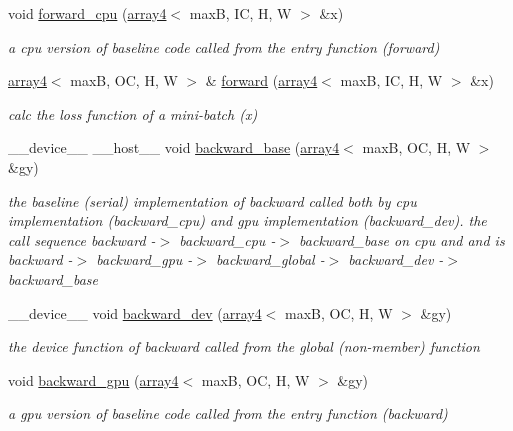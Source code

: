 \begin{DoxyCompactItemize}
void \hyperlink{structConvolution2D_ac1dcf1aebcf205c34bbf604d3b68562b}{forward\+\_\+cpu} (\hyperlink{structarray4}{array4}$<$ maxB, IC, H, W $>$ \&x)
\begin{DoxyCompactList}\small\item\em a cpu version of baseline code called from the entry function (forward) \end{DoxyCompactList}\item 
\hyperlink{structarray4}{array4}$<$ maxB, OC, H, W $>$ \& \hyperlink{structConvolution2D_ae6dcfaea38b779de24bbda730c57083e}{forward} (\hyperlink{structarray4}{array4}$<$ maxB, IC, H, W $>$ \&x)
\begin{DoxyCompactList}\small\item\em calc the loss function of a mini-\/batch (x) \end{DoxyCompactList}\item 
\+\_\+\+\_\+device\+\_\+\+\_\+ \+\_\+\+\_\+host\+\_\+\+\_\+ void \hyperlink{structConvolution2D_af202e85ae6c5aa5e4aae6869a8891fc3}{backward\+\_\+base} (\hyperlink{structarray4}{array4}$<$ maxB, OC, H, W $>$ \&gy)
\begin{DoxyCompactList}\small\item\em the baseline (serial) implementation of backward called both by cpu implementation (backward\+\_\+cpu) and gpu implementation (backward\+\_\+dev). the call sequence backward -\/$>$ backward\+\_\+cpu -\/$>$ backward\+\_\+base on cpu and and is backward -\/$>$ backward\+\_\+gpu -\/$>$ backward\+\_\+global -\/$>$ backward\+\_\+dev -\/$>$ backward\+\_\+base \end{DoxyCompactList}\item 
\+\_\+\+\_\+device\+\_\+\+\_\+ void \hyperlink{structConvolution2D_a144c8af173f1cbb9e7efade3b2f19f1e}{backward\+\_\+dev} (\hyperlink{structarray4}{array4}$<$ maxB, OC, H, W $>$ \&gy)
\begin{DoxyCompactList}\small\item\em the device function of backward called from the global (non-\/member) function \end{DoxyCompactList}\item 
void \hyperlink{structConvolution2D_af7105f910c11a7bd93e27a7abc06e502}{backward\+\_\+gpu} (\hyperlink{structarray4}{array4}$<$ maxB, OC, H, W $>$ \&gy)
\begin{DoxyCompactList}\small\item\em a gpu version of baseline code called from the entry function (backward) \end{DoxyCompactList}\item 

\end{DoxyCompactItemize}
